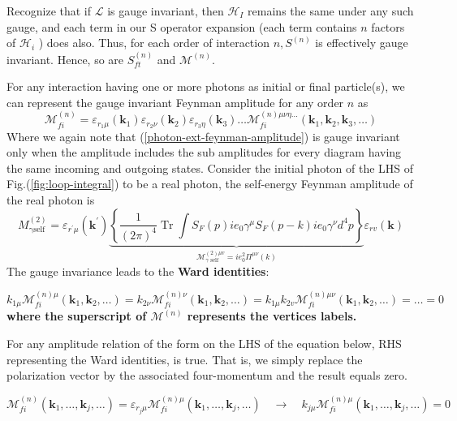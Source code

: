 Recognize that if $\mathcal{L}$ is gauge invariant, then $\mathcal{H}_I$ remains the same under any such gauge, and each term in our S operator expansion (each term contains $n$ factors of $\mathcal{H}_{i}$ ) does also. Thus, for each order of interaction $n, S^{(n)}$ is effectively gauge invariant. Hence, so are $S_{f t}^{(n)}$ and $\mathcal{M}^{(n)}$.

For any interaction having one or more photons as initial or final particle(s), we can represent the gauge invariant Feynman amplitude for any order $n$ as
\begin{equation}\mathcal{M}_{f i}^{(n)}=\varepsilon_{r_1 \mu}\left(\mathbf{k}_{1}\right) \varepsilon_{r_{2} \nu}\left(\mathbf{k}_{2}\right) \varepsilon_{r_{3} \eta}\left(\mathbf{k}_{3}\right) \ldots \mathcal{M}_{f i}^{(n) \mu \nu\eta\ldots}\left(\mathbf{k}_{1}, \mathbf{k}_{2}, \mathbf{k}_{3}, \ldots\right)
\label{photon-ext-feynman-amplitude}
\end{equation}
Where we again note that (\ref{photon-ext-feynman-amplitude}) is gauge invariant only when the amplitude includes the sub amplitudes for every diagram having the same incoming and outgoing states. Consider the initial photon of the LHS of Fig.(\ref{fig:loop-integral}) to be a real photon, the self-energy Feynman amplitude of the real photon is
$$M_{\operatorname{\gamma self}}^{(2)}=\varepsilon_{r^{\prime} \mu}\left(\mathbf{k}^{\prime}\right)\underbrace{\left\{\frac{1}{(2 \pi)^{4}} \operatorname{Tr} \int S_{F}(p) i e_{0} \gamma^{\mu} S_{F}(p-k) i e_{0} \gamma^{\nu} d^{4} p\right\}}_{\mathcal{M}_{\gamma \text { self }}^{(2) \mu v}=i e_{0}^{2} \Pi^{\mu \nu}(k)} \varepsilon_{r v}(\mathbf{k})$$
The gauge invariance leads to the \textbf{Ward identities}:
\begin{qt}
    \begin{equation}k_{1 \mu} \mathcal{M}_{f i}^{(n) \mu}\left(\mathbf{k}_{1}, \mathbf{k}_{2}, \ldots\right)=k_{2 \nu} \mathcal{M}_{f i}^{(n) \nu}\left(\mathbf{k}_{1}, \mathbf{k}_{2}, \ldots\right)=k_{1 \mu} k_{2 v} \mathcal{M}_{f i}^{(n)  \mu \nu}\left(\mathbf{k}_{1}, \mathbf{k}_{2}, \ldots\right)=\ldots =0\end{equation}
    \textbf{where the superscript of $\mathcal{M}^{(n)}$ represents the vertices labels.}
\end{qt}
For any amplitude relation of the form on the LHS of the equation below, RHS representing the Ward identities, is true. That is, we simply replace the polarization vector by the associated four-momentum and the result equals zero.
\begin{qt}
    \begin{equation}\mathcal{M}_{f i}^{(n)}\left(\mathbf{k}_{1}, \ldots, \mathbf{k}_{j}, \ldots\right)=\varepsilon_{r_{j} \mu} \mathcal{M}_{f i}^{(n) \mu}\left(\mathbf{k}_{1}, \ldots, \mathbf{k}_{j}, \ldots\right) \quad \rightarrow \quad k_{j \mu} \mathcal{M}_{f i}^{(n) \mu}\left(\mathbf{k}_{1}, \ldots, \mathbf{k}_{j}, \ldots\right)=0
    \label{ward-identity-2}
    \end{equation}
\end{qt}
\textbf{}

